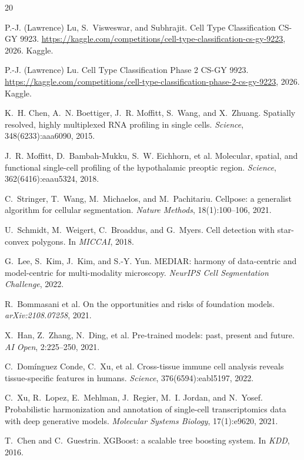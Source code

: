 \documentclass[a4paper,11pt]{article}
\begin{document}
\begin{thebibliography}{20}

P.-J. (Lawrence) Lu, S.~Visweswar, and Subhrajit.
\newblock Cell Type Classification CS-GY 9923.
\newblock \url{https://kaggle.com/competitions/cell-type-classification-cs-gy-9223}, 2026. Kaggle.

P.-J. (Lawrence) Lu.
\newblock Cell Type Classification Phase 2 CS-GY 9923.
\newblock \url{https://kaggle.com/competitions/cell-type-classification-phase-2-cs-gy-9223}, 2026. Kaggle.

K.~H. Chen, A.~N. Boettiger, J.~R. Moffitt, S.~Wang, and X.~Zhuang.
\newblock Spatially resolved, highly multiplexed RNA profiling in single cells.
\newblock \emph{Science}, 348(6233):aaa6090, 2015.

J.~R. Moffitt, D.~Bambah-Mukku, S.~W. Eichhorn, et al.
\newblock Molecular, spatial, and functional single-cell profiling of the hypothalamic preoptic region.
\newblock \emph{Science}, 362(6416):eaau5324, 2018.

C.~Stringer, T.~Wang, M.~Michaelos, and M.~Pachitariu.
\newblock Cellpose: a generalist algorithm for cellular segmentation.
\newblock \emph{Nature Methods}, 18(1):100--106, 2021.

U.~Schmidt, M.~Weigert, C.~Broaddus, and G.~Myers.
\newblock Cell detection with star-convex polygons.
\newblock In \emph{MICCAI}, 2018.

G.~Lee, S.~Kim, J.~Kim, and S.-Y. Yun.
\newblock MEDIAR: harmony of data-centric and model-centric for multi-modality microscopy.
\newblock \emph{NeurIPS Cell Segmentation Challenge}, 2022.

R.~Bommasani et al.
\newblock On the opportunities and risks of foundation models.
\newblock \emph{arXiv:2108.07258}, 2021.

X.~Han, Z.~Zhang, N.~Ding, et al.
\newblock Pre-trained models: past, present and future.
\newblock \emph{AI Open}, 2:225--250, 2021.

C.~Dom\'{i}nguez Conde, C.~Xu, et al.
\newblock Cross-tissue immune cell analysis reveals tissue-specific features in humans.
\newblock \emph{Science}, 376(6594):eabl5197, 2022.

C.~Xu, R.~Lopez, E.~Mehlman, J.~Regier, M.~I. Jordan, and N.~Yosef.
\newblock Probabilistic harmonization and annotation of single-cell transcriptomics data with deep generative models.
\newblock \emph{Molecular Systems Biology}, 17(1):e9620, 2021.

T.~Chen and C.~Guestrin.
\newblock XGBoost: a scalable tree boosting system.
\newblock In \emph{KDD}, 2016.

\end{thebibliography}

\end{document}
